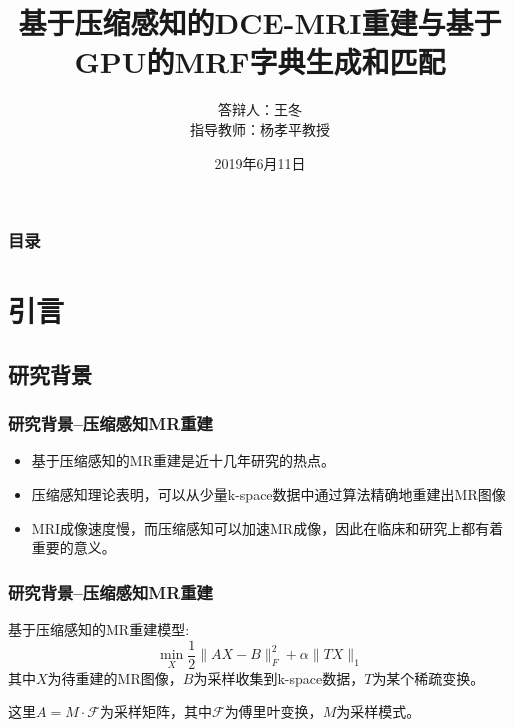 \documentclass{beamer}
\title[博士学位论文答辩]{基于压缩感知的DCE-MRI重建与基于GPU的MRF字典生成和匹配} %
\author[王冬]{
答辩人：王冬 \\
指导教师：杨孝平\quad 教授
} %
\institute[南京理工大学] %
{
南京理工大学 \\ %
\medskip
\textit{理学院} 
}
\date{2019年6月11日} %
\begin{document}
\begin{frame}
\titlepage %
\end{frame}

\begin{frame}
\frametitle{目录} %
\tableofcontents %
\end{frame}


\section{引言}

\subsection{研究背景}
\begin{frame}
	\frametitle{研究背景--压缩感知MR重建}
	\begin{itemize}
		\item 基于压缩感知的MR重建是近十几年研究的热点。
		\item 压缩感知理论表明，可以从少量k-space数据中通过算法精确地重建出MR图像
		\item MRI成像速度慢，而压缩感知可以加速MR成像，因此在临床和研究上都有着重要的意义。
	\end{itemize}
\end{frame}

\begin{frame}
	\frametitle{研究背景--压缩感知MR重建}
	基于压缩感知的MR重建模型:
	\begin{equation}
		\min_X \frac{1}{2}\|AX-B\|_F^2+\alpha\|TX\|_1
	\end{equation}
	其中$X$为待重建的MR图像，$B$为采样收集到k-space数据，$T$为某个稀疏变换。
	
	这里$A=M\cdot\mathcal{F}$为采样矩阵，其中$\mathcal{F}$为傅里叶变换，$M$为采样模式。
\end{frame}
\end{document}
